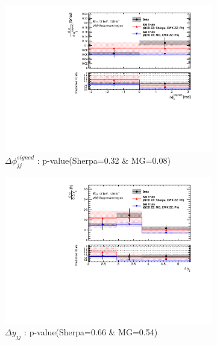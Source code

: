 \begin{figure}[!htb]
\begin{subfigure}{.49\textwidth}
        \centering
        \includegraphics[width=.98\linewidth]{figures/Results/CrossSection_VBSSuppressed/xs_dphi_CR.pdf}
        \caption{ \footnotesize{$\Delta \phi _{jj}^{signed}$ }: p-value(Sherpa=0.32 $\&$ MG=0.08)}
    \end{subfigure}
    \begin{subfigure}{.49\textwidth}
        \centering
        \includegraphics[width=.98\linewidth]{figures/Results/CrossSection_VBSSuppressed/xs_dy_CR.pdf}
        \caption{ \footnotesize{$\Delta y_{jj}$ }: p-value(Sherpa=0.66 $\&$ MG=0.54)}
    \end{subfigure}\\
    \begin{subfigure}{.49\textwidth}
        \centering

\end{subfigure}
\end{figure}
